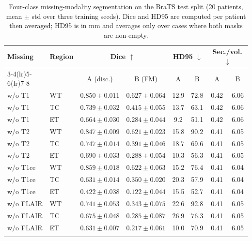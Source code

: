 \begin{table}[t]
\centering
\caption{Four-class missing-modality segmentation on the BraTS test split (20 patients, mean $\pm$ std over three training seeds). Dice and HD95 are computed per patient then averaged; HD95 is in mm and averages only over cases where both masks are non-empty.}
\label{tab:main}
\begin{tabular}{llcccccc}
\toprule
Missing & Region & \multicolumn{2}{c}{Dice $\uparrow$} & \multicolumn{2}{c}{HD95 $\downarrow$} & \multicolumn{2}{c}{Sec./vol. $\downarrow$} \\
\cmidrule(lr){3-4}\cmidrule(lr){5-6}\cmidrule(lr){7-8}
& & A (disc.) & B (FM) & A & B & A & B \\
\midrule
w/o T1 & WT & $0.850\pm0.011$ & $0.627\pm0.064$ & 12.9 & 72.8 & 0.42 & 6.06 \\
w/o T1 & TC & $0.739\pm0.032$ & $0.415\pm0.055$ & 13.7 & 63.1 & 0.42 & 6.06 \\
w/o T1 & ET & $0.664\pm0.030$ & $0.284\pm0.044$ & 9.2 & 51.1 & 0.42 & 6.06 \\
\addlinespace
w/o T2 & WT & $0.847\pm0.009$ & $0.621\pm0.023$ & 15.8 & 90.2 & 0.41 & 6.05 \\
w/o T2 & TC & $0.747\pm0.014$ & $0.391\pm0.046$ & 18.7 & 69.6 & 0.41 & 6.05 \\
w/o T2 & ET & $0.690\pm0.033$ & $0.288\pm0.054$ & 10.3 & 56.3 & 0.41 & 6.05 \\
\addlinespace
w/o T1ce & WT & $0.859\pm0.018$ & $0.622\pm0.063$ & 15.2 & 76.4 & 0.41 & 6.04 \\
w/o T1ce & TC & $0.631\pm0.014$ & $0.350\pm0.020$ & 20.3 & 57.9 & 0.41 & 6.04 \\
w/o T1ce & ET & $0.422\pm0.038$ & $0.122\pm0.044$ & 15.5 & 52.7 & 0.41 & 6.04 \\
\addlinespace
w/o FLAIR & WT & $0.741\pm0.053$ & $0.343\pm0.075$ & 22.6 & 92.8 & 0.41 & 6.05 \\
w/o FLAIR & TC & $0.675\pm0.048$ & $0.285\pm0.087$ & 26.9 & 76.3 & 0.41 & 6.05 \\
w/o FLAIR & ET & $0.631\pm0.007$ & $0.217\pm0.061$ & 10.0 & 70.9 & 0.41 & 6.05 \\
\addlinespace
\bottomrule
\end{tabular}
\end{table}
